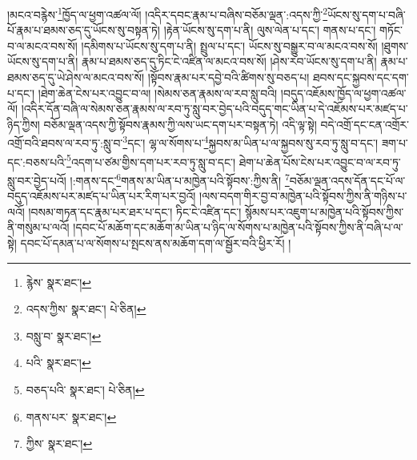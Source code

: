 །མངའ་བརྙེས་\footnote{རྙེས་  སྣར་ཐང་། }ཁྱོད་ལ་ཕྱག་འཚལ་ལོ། །འདིར་དབང་རྣམ་པ་བཞིས་བཅོམ་ལྡན་:འདས་ཀྱི་\footnote{འདས་ཀྱིས་  སྣར་ཐང་།  པེ་ཅིན། }ཡོངས་སུ་དག་པ་བཞི་པོ་རྣམ་པ་ཐམས་ཅད་དུ་ཡོངས་སུ་བསྟན་ཏེ། །རྟེན་ཡོངས་སུ་དག་པ་ནི། ལུས་ལེན་པ་དང་། གནས་པ་དང་། གཏོང་བ་ལ་མངའ་བས་སོ། །དམིགས་པ་ཡོངས་སུ་དག་པ་ནི། སྤྲུལ་པ་དང་། ཡོངས་སུ་བསྒྱུར་བ་ལ་མངའ་བས་སོ། །ཐུགས་ཡོངས་སུ་དག་པ་ནི། རྣམ་པ་ཐམས་ཅད་དུ་ཏིང་ངེ་འཛིན་ལ་མངའ་བས་སོ། །ཤེས་རབ་ཡོངས་སུ་དག་པ་ནི། རྣམ་པ་ཐམས་ཅད་དུ་ཡེ་ཤེས་ལ་མངའ་བས་སོ། །སྟོབས་རྣམ་པར་དབྱེ་བའི་ཚིགས་སུ་བཅད་པ། ཐབས་དང་སྐྱབས་དང་དག་པ་དང་། །ཐེག་ཆེན་ངེས་པར་འབྱུང་བ་ལ། །སེམས་ཅན་རྣམས་ལ་རབ་སླུ་བའི། །བདུད་འཇོམས་ཁྱོད་ལ་ཕྱག་འཚལ་ལོ། །འདིར་དོན་བཞི་ལ་སེམས་ཅན་རྣམས་ལ་རབ་ཏུ་སླུ་བར་བྱེད་པའི་བདུད་གང་ཡིན་པ་དེ་འཇོམས་པར་མཛད་པ་ཉིད་ཀྱིས། བཅོམ་ལྡན་འདས་ཀྱི་སྟོབས་རྣམས་ཀྱི་ལས་ཡང་དག་པར་བསྟན་ཏེ། འདི་ལྟ་སྟེ། བདེ་འགྲོ་དང་ངན་འགྲོར་འགྲོ་བའི་ཐབས་ལ་རབ་ཏུ་:སླུ་བ་\footnote{བསླུ་བ་  སྣར་ཐང་། }དང་། ལྷ་ལ་སོགས་པ་\footnote{པའི་  སྣར་ཐང་། }སྐྱབས་མ་ཡིན་པ་ལ་སྐྱབས་སུ་རབ་ཏུ་སླུ་བ་དང་། ཟག་པ་དང་:བཅས་པའི་\footnote{བཅད་པའི་  སྣར་ཐང་།  པེ་ཅིན། }འདག་པ་ཙམ་གྱིས་དག་པར་རབ་ཏུ་སླུ་བ་དང་། ཐེག་པ་ཆེན་པོས་ངེས་པར་འབྱུང་བ་ལ་རབ་ཏུ་སླུ་བར་བྱེད་པའོ། །:གནས་དང་\footnote{གནས་པར་  སྣར་ཐང་། }གནས་མ་ཡིན་པ་མཁྱེན་པའི་སྟོབས་:ཀྱིས་ནི། \footnote{ཀྱིས་  སྣར་ཐང་། }བཅོམ་ལྡན་འདས་དོན་དང་པོ་ལ་བདུད་འཇོམས་པར་མཛད་པ་ཡིན་པར་རིག་པར་བྱའོ། །ལས་བདག་གིར་བྱ་བ་མཁྱེན་པའི་སྟོབས་ཀྱིས་ནི་གཉིས་པ་ལའོ། །བསམ་གཏན་དང་རྣམ་པར་ཐར་པ་དང་། ཏིང་ངེ་འཛིན་དང་། སྙོམས་པར་འཇུག་པ་མཁྱེན་པའི་སྟོབས་ཀྱིས་ནི་གསུམ་པ་ལའོ། །དབང་པོ་མཆོག་དང་མཆོག་མ་ཡིན་པ་ཉིད་ལ་སོགས་པ་མཁྱེན་པའི་སྟོབས་ཀྱིས་ནི་བཞི་པ་ལ་སྟེ། དབང་པོ་དམན་པ་ལ་སོགས་པ་སྤངས་ནས་མཆོག་དག་ལ་སྦྱོར་བའི་ཕྱིར་རོ། །
